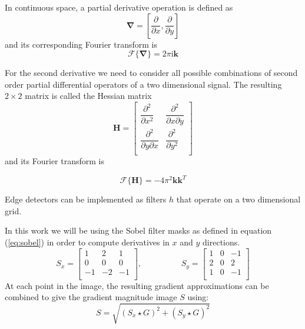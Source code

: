 		In continuous space, a partial derivative operation is defined as
		\begin{equation}
		 	\mathbf{\nabla} = \left[ \dfrac{\partial}{\partial x}, \dfrac{\partial}{\partial y} \right]
		\end{equation}
		and its corresponding Fourier transform is
		\begin{equation}
			\mathscr{F}\{\mathbf{\nabla}\} = 2 \pi \text{i} \mathbf{k}
		\end{equation}
		
		For the second derivative we need to consider all possible combinations of second order partial differential operators of a two dimensional signal. The resulting $2 \times 2$ matrix is called the Hessian matrix
		\begin{equation}
			\mathbf{H} = 
				\begin{bmatrix}
   \dfrac{\partial^2}{\partial x^2}       & \dfrac{\partial^2}{\partial x \partial y}\\
   \dfrac{\partial^2}{\partial y \partial x}       & \dfrac{\partial^2}{\partial y^2}\\
				\end{bmatrix}
				\label{eq:hessian_def}
		\end{equation}
		and its Fourier transform is
		
		\begin{equation}
			\mathscr{F}\{\mathbf{H}\} = -4 \pi^2 \mathbf{k}\mathbf{k}^T
		\end{equation}
		
		
		Edge detectors can be implemented as filters $h$ that operate on a two dimensional grid. 

			
		In this work we will be using the Sobel filter masks as defined in equation (\ref{eq:sobel}) in order to compute derivatives in $x$ and $y$ directions. 
		\begin{equation}
			S_x =
			 \begin{bmatrix}
     				1	& 2 & 1 \\
    					0	 & 0 & 0 \\
    					-1	 & -2 & -1 \\
				\end{bmatrix},
			\hspace{2cm}
			S_y = 
				\begin{bmatrix}
     				1	& 0 & -1 \\
    					2	 & 0 & 2 \\
    					1	 & 0 & -1 \\
				\end{bmatrix}
			\label{eq:sobel}
			\end{equation}
		At each point in the image, the resulting gradient approximations can be combined to give the gradient magnitude image $S$ using:
		\begin{equation}
			S = \sqrt{(S_x \star G )^2 + (S_y \star G)^2}
			\label{eq:grad_sobel}
		\end{equation}

